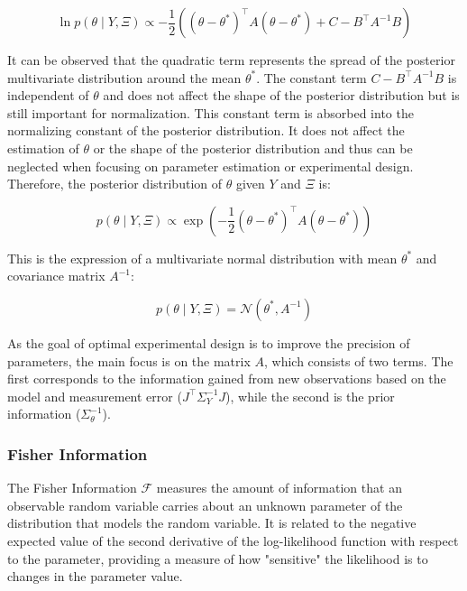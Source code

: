 \documentclass[../Article_Design_of_Experiment.tex]{subfiles}
\begin{document}
	{\footnotesize 
		\begin{equation} 
			\ln p\left(\theta \mid Y, \Xi \right) \propto -\frac{1}{2} \left( \left( \theta - \theta^* \right)^\top A \left( \theta - \theta^* \right) + C - B^\top A^{-1} B \right) 
		\end{equation} }
	
	It can be observed that the quadratic term represents the spread of the posterior multivariate distribution around the mean $\theta^*$. The constant term $C - B^\top A^{-1} B$ is independent of $\theta$ and does not affect the shape of the posterior distribution but is still important for normalization. This constant term is absorbed into the normalizing constant of the posterior distribution. It does not affect the estimation of $\theta$ or the shape of the posterior distribution and thus can be neglected when focusing on parameter estimation or experimental design. Therefore, the posterior distribution of $\theta$ given $Y$ and $\Xi$ is:
	
	{\footnotesize \begin{equation} p\left(\theta \mid Y, \Xi \right) \propto \exp \left( -\frac{1}{2} \left( \theta - \theta^* \right)^\top A \left( \theta - \theta^* \right) \right) \end{equation} }
	
	This is the expression of a multivariate normal distribution with mean $\theta^*$ and covariance matrix $A^{-1}$:
	
	{\footnotesize \begin{equation} p\left(\theta \mid Y, \Xi \right) = \mathcal{N}\left( \theta^*, A^{-1} \right) \end{equation} }
	
	As the goal of optimal experimental design is to improve the precision of parameters, the main focus is on the matrix $A$, which consists of two terms. The first corresponds to the information gained from new observations based on the model and measurement error ($J^\top \Sigma_Y^{-1} J$), while the second is the prior information ($\Sigma_\theta^{-1}$).
	
	\subsubsection{Fisher Information}
	
	The Fisher Information $\mathcal{F}$ measures the amount of information that an observable random variable carries about an unknown parameter of the distribution that models the random variable. It is related to the negative expected value of the second derivative of the log-likelihood function with respect to the parameter, providing a measure of how "sensitive" the likelihood is to changes in the parameter value.
	
\end{document}
